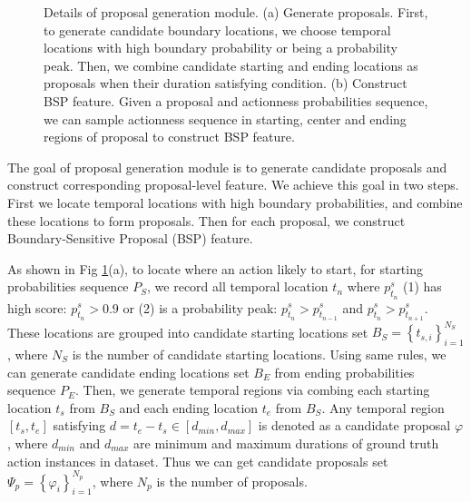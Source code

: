 \documentclass[runningheads]{llncs}
\begin{document}
\begin{figure}[t]
\setlength{\abovecaptionskip}{-0.0cm} %
\setlength{\belowcaptionskip}{-0.5cm} %
\centering
\makeatletter\def\@captype{figure}\makeatother
{}
\hspace{-0.2 in}
\caption{Details of proposal generation module. (a) Generate proposals. First, to generate candidate boundary locations, we choose temporal locations with high boundary probability or being a probability peak. Then, we combine candidate starting and ending locations as proposals when their duration satisfying  condition.
(b) Construct BSP feature. Given a proposal and actionness probabilities sequence, we can sample actionness sequence in starting, center and ending regions of proposal to construct BSP feature.}
\label{fig_pgm}
\end{figure}



The goal of proposal generation module is to generate candidate proposals and construct corresponding proposal-level feature.
We achieve this goal in two steps. First we locate temporal locations with high boundary probabilities, and combine these locations to form proposals. Then for each proposal, we construct Boundary-Sensitive Proposal (BSP) feature.

As shown in Fig \ref{fig_pgm}(a), to locate where an action likely to start, for starting probabilities sequence $P_S$, we record all temporal location $t_n$ where  $p^s_{t_n}$ (1) has high score: $p^s_{t_n}> 0.9$ or  (2) is a probability peak: $p^s_{t_n}> p^s_{t_{n-1}}$ and $p^s_{t_n}> p^s_{t_{n+1}}$.
These locations are  grouped into candidate starting locations set $B_S=\left \{ t_{s,i} \right \}_{i=1}^{N_S}$, where $N_S$ is the number of candidate starting locations.
%
Using same rules, we can generate candidate ending locations set $B_E$ from ending probabilities sequence $P_E$.
Then, we generate temporal regions via combing each starting location $t_{s}$ from $B_S$ and each ending location $t_{e}$ from $B_S$.
Any temporal region $\left [ t_s, t_e \right ]$ satisfying $ d=t_e- t_s \in [d_{min}, d_{max}]$ is denoted as a candidate proposal $\varphi$, where $d _{min}$ and $d_{max}$ are minimum and maximum durations of ground truth action instances in dataset. Thus we can get candidate proposals set $\Psi_p=\left \{ \varphi_i \right \}_{i=1}^{N_p}$, where $N_p$ is the number of proposals.
\end{document}
